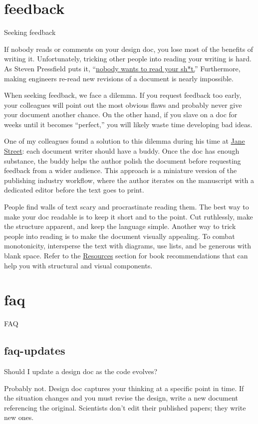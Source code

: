 \documentclass{article}
\begin{document}
\section{feedback}{Seeking feedback}

If nobody reads or comments on your design doc, you lose most of the benefits of writing it.
Unfortunately, tricking other people into reading your writing is hard.
As Steven Pressfield puts it, ``\href{https://www.amazon.com/gp/product/B01GZ1TJBI}{nobody wants to read your sh*t.}''
Furthermore, making engineers re-read new revisions of a document is nearly impossible.

When seeking feedback, we face a dilemma.
If you request feedback too early, your colleagues will point out the most obvious flaws and probably never give your document another chance.
On the other hand, if you slave on a doc for weeks until it becomes ``perfect,'' you will likely waste time developing bad ideas.

One of my colleagues found a solution to this dilemma during his time at \href{https://www.janestreet.com/}{Jane Street}:
each document writer should have a buddy.
Once the doc has enough substance, the buddy helps the author polish the document before requesting feedback from a wider audience.
This approach is a miniature version of the publishing industry workflow, where the author iterates on the manuscript with a dedicated editor before the text goes to print.

People find walls of text scary and procrastinate reading them.
The best way to make your doc readable is to keep it short and to the point.
Cut ruthlessly, make the structure apparent, and keep the language simple.
Another way to trick people into reading is to make the document visually appealing.
To combat monotonicity, intersperse the text with diagrams, use lists, and be generous with blank space.
Refer to the \href{#resources}{Resources} section for book recommendations that can help you with structural and visual components.

\section{faq}{FAQ}

\subsection{faq-updates}{Should I update a design doc as the code evolves?}

Probably not.
Design doc captures your thinking at a specific point in time.
If the situation changes and you must revise the design, write a new document referencing the original.
Scientists don't edit their published papers; they write new ones.
\end{document}
